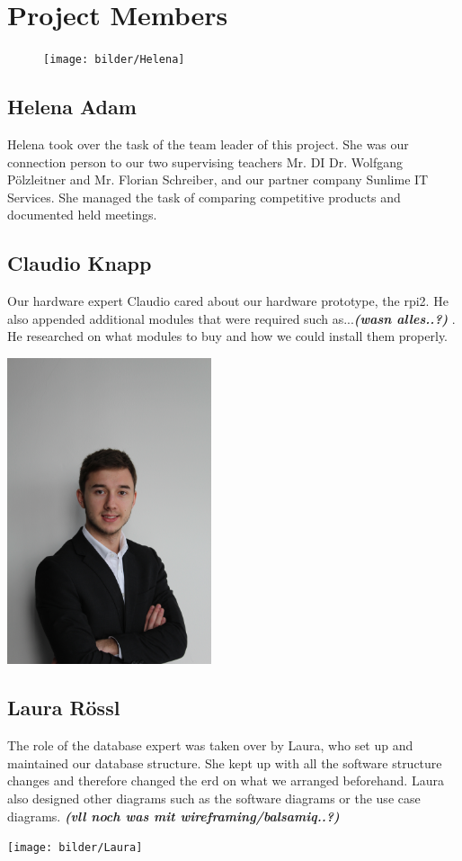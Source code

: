 \chapter*{Project Members}
\begin{figure}
    \texttt{[image: bilder/Helena]}
\end{figure}
\section*{Helena Adam}
Helena took over the task of the team leader of this project. She was our connection person to our two supervising teachers Mr. DI Dr. Wolfgang Pölzleitner and Mr. Florian Schreiber, and our partner company Sunlime IT Services. She managed the task of comparing competitive products and documented held meetings.
\section*{Claudio Knapp}
Our hardware expert Claudio cared about our hardware prototype, the \gls{rpi2}. He also appended additional modules that were required such as...\textit{\textbf{(wasn alles..?)}} . He researched on what modules to buy and how we could install them properly. 
\begin{center}
\includegraphics[width=0.45\textwidth, angle =-90]{bilder/Claudio}
\end{center}
\section*{Laura Rössl}
The role of the database expert was taken over by Laura, who set up and maintained our database structure. She kept up with all the software structure changes and therefore changed the \gls{erd} on what we arranged beforehand. Laura also designed other diagrams such as the software diagrams or the use case diagrams. \textit{\textbf{(vll noch was mit wireframing/balsamiq..?)}}
\begin{center}
\texttt{[image: bilder/Laura]}
\end{center}
